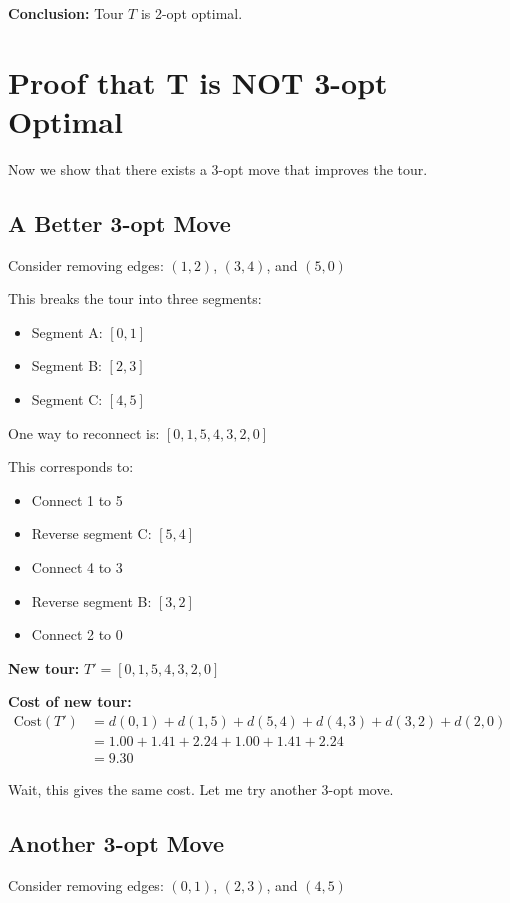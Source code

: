 \documentclass[12pt,a4paper]{article}
\begin{document}
\textbf{Conclusion:} Tour $T$ is 2-opt optimal.

\section{Proof that T is NOT 3-opt Optimal}

Now we show that there exists a 3-opt move that improves the tour.

\subsection{A Better 3-opt Move}

Consider removing edges: $(1,2)$, $(3,4)$, and $(5,0)$

This breaks the tour into three segments:
\begin{itemize}
    \item Segment A: $[0, 1]$
    \item Segment B: $[2, 3]$
    \item Segment C: $[4, 5]$
\end{itemize}

One way to reconnect is: $[0, 1, 5, 4, 3, 2, 0]$

This corresponds to:
\begin{itemize}
    \item Connect 1 to 5
    \item Reverse segment C: $[5, 4]$
    \item Connect 4 to 3
    \item Reverse segment B: $[3, 2]$
    \item Connect 2 to 0
\end{itemize}

\textbf{New tour:} $T' = [0, 1, 5, 4, 3, 2, 0]$

\textbf{Cost of new tour:}
\begin{align*}
\text{Cost}(T') &= d(0,1) + d(1,5) + d(5,4) + d(4,3) + d(3,2) + d(2,0) \\
&= 1.00 + 1.41 + 2.24 + 1.00 + 1.41 + 2.24 \\
&= 9.30
\end{align*}

Wait, this gives the same cost. Let me try another 3-opt move.

\subsection{Another 3-opt Move}

Consider removing edges: $(0,1)$, $(2,3)$, and $(4,5)$
\end{document}
